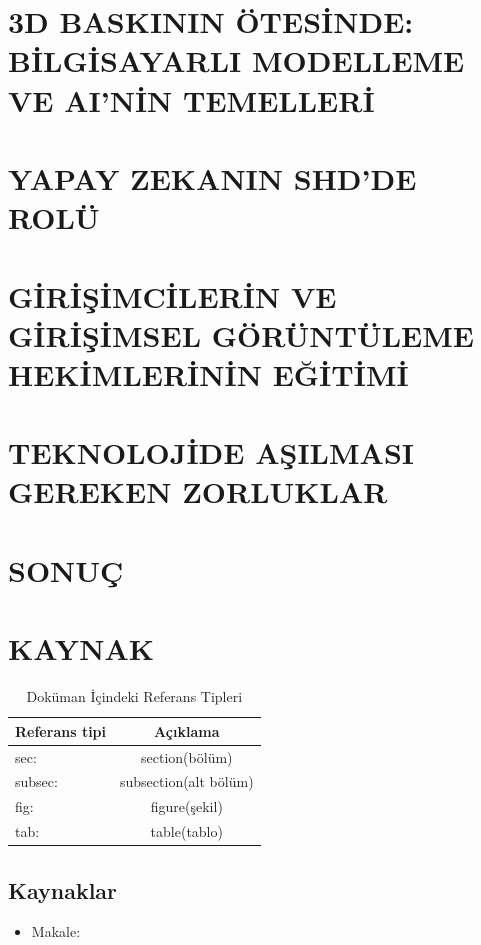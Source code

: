 \documentclass{IEEEtran}
\begin{document}
\section{3D BASKININ ÖTESİNDE: BİLGİSAYARLI MODELLEME VE AI'NİN TEMELLERİ}
\label{sec:öte}

\section{YAPAY ZEKANIN SHD'DE ROLÜ}
\label{sec:ai}

\section{GİRİŞİMCİLERİN VE GİRİŞİMSEL GÖRÜNTÜLEME HEKİMLERİNİN EĞİTİMİ}
\label{sec:girişim}

\section{TEKNOLOJİDE AŞILMASI GEREKEN ZORLUKLAR}
\label{sec:tek}

\section{SONUÇ}
\label{sec:sonuc}

\section{KAYNAK}
\label{sec:kaynak}

\begin{table}
\caption{Doküman İçindeki Referans Tipleri}
\label{tab:referans}
\centering
\begin{tabular}{|l|c|} \hline
Referans tipi & Açıklama \\ \hline
sec: & section(bölüm) \\
subsec: & subsection(alt bölüm) \\
fig: & figure(şekil) \\
tab: & table(tablo) \\
\hline
\end{tabular}
\end{table}

\subsection{Kaynaklar}
\begin{itemize}
 \item Makale: \cite{ELSEVIER}
\end{itemize}
\end{document}

